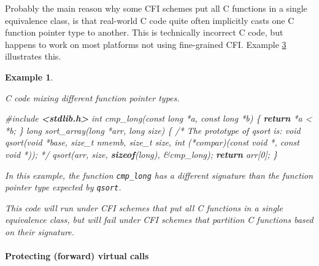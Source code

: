 \documentclass[
  a4paper,
]{report}
\newtheorem{example}{Example}
\newenvironment{Shaded}{}{}
\newcommand{\CommentTok}[1]{\textcolor[rgb]{0.38,0.63,0.69}{\textit{#1}}}
\newcommand{\ControlFlowTok}[1]{\textcolor[rgb]{0.00,0.44,0.13}{\textbf{#1}}}
\newcommand{\DataTypeTok}[1]{\textcolor[rgb]{0.56,0.13,0.00}{#1}}
\newcommand{\DecValTok}[1]{\textcolor[rgb]{0.25,0.63,0.44}{#1}}
\newcommand{\ImportTok}[1]{\textcolor[rgb]{0.00,0.50,0.00}{\textbf{#1}}}
\newcommand{\KeywordTok}[1]{\textcolor[rgb]{0.00,0.44,0.13}{\textbf{#1}}}
\newcommand{\NormalTok}[1]{#1}
\newcommand{\OperatorTok}[1]{\textcolor[rgb]{0.40,0.40,0.40}{#1}}
\newcommand{\PreprocessorTok}[1]{\textcolor[rgb]{0.74,0.48,0.00}{#1}}
\begin{document}
Probably the main reason why some CFI schemes put all C functions in a
single equivalence class, is that real-world C code quite often
implicitly casts one C function pointer type to another. This is
technically incorrect C code, but happens to work on most platforms not
using fine-grained CFI. Example \hyperref[ex:qsort-cfi]{3} illustrates
this.

\label{ex:qsort-cfi}
\begin{example}

\label{ex:qsort-cfi}

\textup{C code mixing different function pointer types.}

\begin{Shaded}
\begin{Highlighting}[]
\PreprocessorTok{\#include }\ImportTok{\textless{}stdlib.h\textgreater{}}
\DataTypeTok{int}\NormalTok{ cmp\_long}\OperatorTok{(}\DataTypeTok{const} \DataTypeTok{long} \OperatorTok{*}\NormalTok{a}\OperatorTok{,} \DataTypeTok{const} \DataTypeTok{long} \OperatorTok{*}\NormalTok{b}\OperatorTok{)} \OperatorTok{\{} \ControlFlowTok{return} \OperatorTok{*}\NormalTok{a }\OperatorTok{\textless{}} \OperatorTok{*}\NormalTok{b}\OperatorTok{;} \OperatorTok{\}}
\DataTypeTok{long}\NormalTok{ sort\_array}\OperatorTok{(}\DataTypeTok{long} \OperatorTok{*}\NormalTok{arr}\OperatorTok{,} \DataTypeTok{long}\NormalTok{ size}\OperatorTok{)} \OperatorTok{\{}
  \CommentTok{/* The prototype of qsort is:}
\CommentTok{     void qsort(void *base, size\_t nmemb, size\_t size,}
\CommentTok{                int (*compar)(const void *, const void *)); */}
\NormalTok{  qsort}\OperatorTok{(}\NormalTok{arr}\OperatorTok{,}\NormalTok{ size}\OperatorTok{,} \KeywordTok{sizeof}\OperatorTok{(}\DataTypeTok{long}\OperatorTok{),} \OperatorTok{\&}\NormalTok{cmp\_long}\OperatorTok{);}
  \ControlFlowTok{return}\NormalTok{ arr}\OperatorTok{[}\DecValTok{0}\OperatorTok{];}
\OperatorTok{\}}
\end{Highlighting}
\end{Shaded}

In this example, the function \texttt{cmp\_long} has a different
signature than the function pointer type expected by \texttt{qsort}.

This code will run under CFI schemes that put all C functions in a
single equivalence class, but will fail under CFI schemes that partition
C functions based on their signature.

\end{example}

\paragraph{Protecting (forward) virtual
calls}\label{protecting-forward-virtual-calls}
\end{document}
